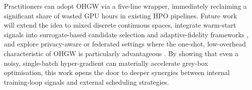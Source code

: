 \documentclass{article}
\begin{document}
Practitioners can adopt OHGW via a five-line wrapper, immediately reclaiming a significant share of wasted GPU hours in existing HPO pipelines. Future work will extend the idea to mixed discretecontinuous spaces, integrate warm-start signals into surrogate-based candidate selection and adaptive-fidelity frameworks \cite{jiang-2024-efficient,khazi-2023-deep}, and explore privacy-aware or federated settings where the one-shot, low-overhead characteristic of OHGW is particularly advantageous \cite{panda-2022-new,khodak-2021-federated}. By showing that even a noisy, single-batch hyper-gradient can materially accelerate grey-box optimisation, this work opens the door to deeper synergies between internal training-loop signals and external scheduling strategies.




\end{document}
